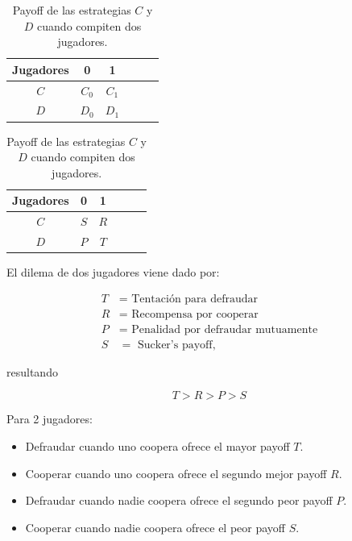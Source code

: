 \documentclass[twocolumn,aps,prl]{revtex4-1}
\begin{document}
\begin{table}[!htb]
    \begin{subtable}{.5\linewidth}
      \centering
        \caption{}
        \begin{tabular}{c|ccccc}
            Jugadores & 0       & 1        \\ \hline
            $C$       & $C_{0}$ & $C_{1}$  \\ \hline
            $D$       & $D_{0}$ & $D_{1}$ 
            \end{tabular}
            \label{tab:my-table}
    \end{subtable}%
    \begin{subtable}{.5\linewidth}
      \centering
        \caption{}
        \begin{tabular}{c|ccccc}
            Jugadores & 0       & 1        \\ \hline
            $C$       & $S$ & $R$  \\ \hline
            $D$       & $P$ & $T$ 
            \end{tabular}
        \end{subtable} 
    \caption{Payoff de las estrategias $C$ y $D$ cuando compiten dos jugadores.}
    \label{tab:my-table}
\end{table}

El dilema de dos jugadores viene dado por:

$$
\begin{aligned}
    T &= \text{ Tentación para defraudar}\\
    R &= \text{ Recompensa por cooperar}\\
    P &= \text{ Penalidad por defraudar mutuamente}\\
    S &= \text{ Sucker's payoff},
\end{aligned}
$$

resultando

$$
T > R > P > S
$$

Para 2 jugadores:

\begin{itemize}
    \item Defraudar cuando uno coopera ofrece el mayor payoff $T$.
    \item Cooperar cuando uno coopera ofrece el segundo mejor payoff $R$.
    \item Defraudar cuando nadie coopera ofrece el segundo peor payoff $P$.
    \item Cooperar cuando nadie coopera ofrece el peor payoff $S$.
\end{itemize}
\end{document}
